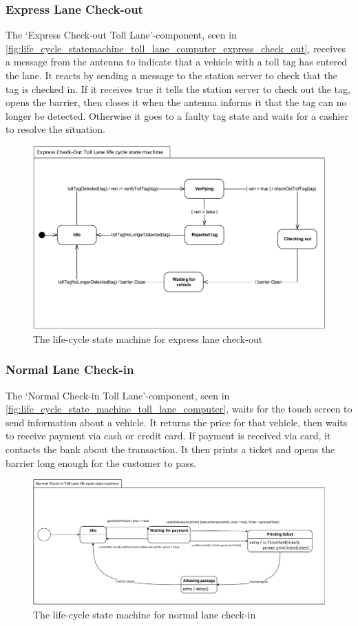 \subsubsection*{Express Lane Check-out}
The ‘Express Check-out Toll Lane’-component, seen in \autoref{fig:life_cycle_statemachine_toll_lane_computer_express_check_out}, receives a message from the antenna to indicate that a vehicle with a toll tag has entered the lane. It reacts by sending a message to the station server to check that the tag is checked in. If it receives true it tells the station server to check out the tag, opens the barrier, then closes it when the antenna informs it that the tag can no longer be detected.  Otherwise it goes to a faulty tag state and waits for a cashier to resolve the situation. 
\begin{figure}[H]
\centering
\includegraphics[width=0.7\linewidth]{img/behaviour_state_machines/life_cycle_state_machines/life_cycle_statemachine_toll_lane_computer_express_check_out}
\caption{The life-cycle state machine for express lane check-out}
\label{fig:life_cycle_statemachine_toll_lane_computer_express_check_out}
\end{figure}

\subsubsection*{Normal Lane Check-in}
The ‘Normal Check-in Toll Lane’-component, seen in \autoref{fig:life_cycle_state_machine_toll_lane_computer}, waits for the touch screen to send information about a vehicle. It returns the price for that vehicle, then waits to receive payment via cash or credit card. If payment is received via card, it contacts the bank about the transaction. It then prints a ticket and opens the barrier long enough for the customer to pass.
\begin{figure}[H]
\centering
\includegraphics[width=0.7\linewidth]{img/behaviour_state_machines/life_cycle_state_machines/life_cycle_state_machine_toll_lane_computer}
\caption{The life-cycle state machine for normal lane check-in}
\label{fig:life_cycle_state_machine_toll_lane_computer}
\end{figure}

